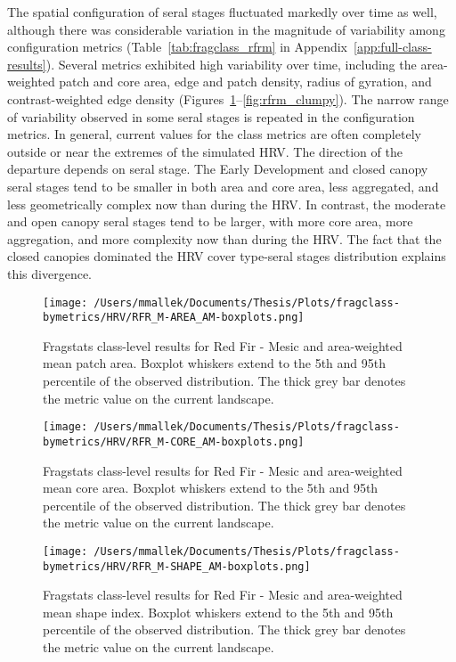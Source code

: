 The spatial configuration of seral stages fluctuated markedly over time as well, although there was considerable variation in the magnitude of variability among configuration metrics (Table~\ref{tab:fragclass_rfrm} in Appendix~\ref{app:full-class-results}). Several metrics exhibited high variability over time, including the area-weighted patch and core area, edge and patch density, radius of gyration, and contrast-weighted edge density (Figures~\ref{fig:rfrm_areaam}--\ref{fig:rfrm_clumpy}). The narrow range of variability observed in some seral stages is repeated in the configuration metrics. In general, current values for the class metrics are often completely outside or near the extremes of the simulated HRV. The direction of the departure depends on seral stage. The Early Development and closed canopy seral stages tend to be smaller in both area and core area, less aggregated, and less geometrically complex now than during the HRV. In contrast, the moderate and open canopy seral stages tend to be larger, with more core area, more aggregation, and more complexity now than during the HRV. The fact that the closed canopies dominated the HRV cover type-seral stages distribution explains this divergence.

\begin{figure}[!htbp]
\centering
    \texttt{[image: /Users/mmallek/Documents/Thesis/Plots/fragclass-bymetrics/HRV/RFR\_M-AREA\_AM-boxplots.png]}
  \caption{Fragstats class-level results for Red Fir - Mesic and area-weighted mean patch area. Boxplot whiskers extend to the 5th and 95th percentile of the observed distribution. The thick grey bar denotes the metric value on the current landscape.}
  \label{fig:rfrm_areaam}
\end{figure}


\begin{figure}[!htbp]
\centering
    \texttt{[image: /Users/mmallek/Documents/Thesis/Plots/fragclass-bymetrics/HRV/RFR\_M-CORE\_AM-boxplots.png]}
  \caption{Fragstats class-level results for Red Fir - Mesic and area-weighted mean core area. Boxplot whiskers extend to the 5th and 95th percentile of the observed distribution. The thick grey bar denotes the metric value on the current landscape.}
  \label{fig:rfrm_coream}
\end{figure}


\begin{figure}[!htbp]
\centering
    \texttt{[image: /Users/mmallek/Documents/Thesis/Plots/fragclass-bymetrics/HRV/RFR\_M-SHAPE\_AM-boxplots.png]}
  \caption{Fragstats class-level results for Red Fir - Mesic and area-weighted mean shape index. Boxplot whiskers extend to the 5th and 95th percentile of the observed distribution. The thick grey bar denotes the metric value on the current landscape.}
  \label{fig:rfrm_shapeam}
\end{figure}


